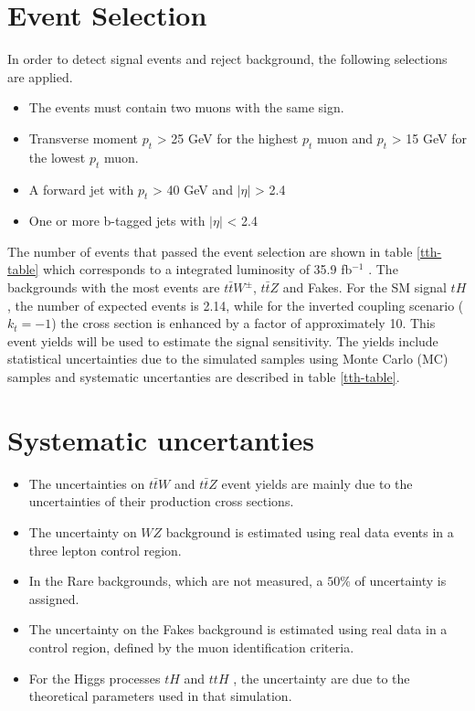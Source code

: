 \section{Event Selection}
In order to detect signal events and reject background, the following selections are applied. 
\begin{itemize}
	\item The events must contain two muons with the same sign.
	\item Transverse moment $p_{t}$ > 25 GeV for the highest $p_t$ muon and $p_{t}$ > 15 GeV for the lowest $p_t$ muon.
	\item A forward jet with $p_t$ > 40 GeV and $|\eta|$ > 2.4
	\item One or more b-tagged jets with  $|\eta|$ < 2.4
\end{itemize}
The number of events that passed the event selection are shown in table \ref{tth-table} which corresponds to  a integrated luminosity of 35.9 fb$^{-1}$ \cite{th1}.
The backgrounds with the most events are $t\bar{t} W^\pm$, $t\bar{t}Z$ and Fakes. For the SM signal $tH$, the number of expected events is 2.14, while for the inverted coupling  scenario ($k_t=-1$) the cross section is enhanced by a factor of approximately 10. 
This event yields  will be used to estimate the signal sensitivity. The yields include statistical uncertainties due to the simulated samples using Monte Carlo (MC) samples and systematic uncertanties are described in table \ref{tth-table}. 


\section{Systematic uncertanties}
\begin{itemize}
\item The uncertainties on $t\bar{t}W$ and $t\bar{t}Z$ event yields are mainly due to the uncertainties of their production cross sections. 
\item The uncertainty on $WZ$ background is estimated using real data events in a three lepton control region. 
\item In the Rare backgrounds, which are not measured, a $50\%$ of uncertainty is assigned.
\item The uncertainty on the Fakes background is estimated using real data in a control region, defined by the muon identification criteria. 
\item For the Higgs processes $tH$ and $ttH$ , the uncertainty are due to the theoretical parameters used in that simulation.
\end{itemize}

